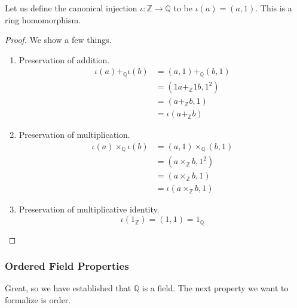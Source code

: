     \begin{theorem}
      Let us define the canonical injection $\iota: \mathbb{Z} \rightarrow \mathbb{Q}$ to be $\iota(a) = (a, 1)$. This is a ring homomorphism. 
    \end{theorem}
    \begin{proof} 
      We show a few things. 
      \begin{enumerate}
        \item Preservation of addition. 
          \begin{align}
            \iota(a) +_{\mathbb{Q}} \iota(b) & = (a, 1) +_{\mathbb{Q}} (b, 1) \\
                                             & = (1a +_{\mathbb{Z}} 1b, 1^2) \\
                                             & = (a +_{\mathbb{Z}} b, 1) \\
                                             & = \iota(a +_{\mathbb{Z}} b) 
          \end{align}
        \item Preservation of multiplication. 
          \begin{align}
            \iota(a) \times_{\mathbb{Q}} \iota(b) & = (a, 1) \times_{\mathbb{Q}} (b, 1) \\
                                                  & = (a \times_{\mathbb{Z}} b, 1^2) \\
                                                  & = (a \times_{\mathbb{Z}} b, 1) \\
                                                  & = \iota(a \times_{\mathbb{Z}} b, 1)
          \end{align}
        \item Preservation of multiplicative identity. 
          \begin{equation}
            \iota(1_{\mathbb{Z}}) = (1, 1) = 1_{\mathbb{Q}}
          \end{equation}
      \end{enumerate}
    \end{proof} 

  \subsubsection{Ordered Field Properties} 

    Great, so we have established that $\mathbb{Q}$ is a field. The next property we want to formalize is order. 

